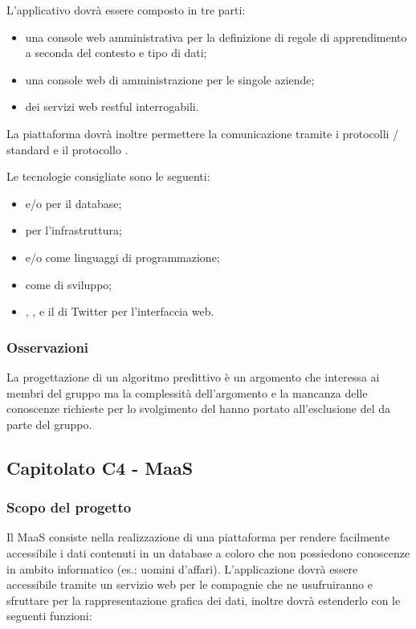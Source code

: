 L'applicativo  dovrà essere composto in tre parti:
\begin{itemize}
	\item una console web amministrativa per la definizione di regole di apprendimento a seconda del contesto e tipo di dati;
	\item una console web di amministrazione per le singole aziende;
	\item dei servizi web restful  interrogabili.
\end{itemize}
La piattaforma dovrà inoltre permettere la comunicazione tramite i protocolli / standard e il protocollo .


Le tecnologie consigliate sono le seguenti:
\begin{itemize}
	\item {} e/o  per il database;
	\item {} per l'infrastruttura;
	\item {} e/o  come linguaggi di programmazione;
	\item {} come  di sviluppo;
	\item {}, ,  e il   di Twitter per l'interfaccia web.
\end{itemize}

\subsubsection{Osservazioni}
La progettazione di un algoritmo predittivo è un argomento che interessa ai membri del gruppo ma la complessità dell'argomento e la mancanza delle conoscenze
richieste per lo svolgimento del  hanno portato all'esclusione del  da parte del gruppo.



\subsection{Capitolato C4 - MaaS}
\subsubsection{Scopo del progetto}
Il  MaaS consiste nella realizzazione di una piattaforma per rendere facilmente accessibile i dati contenuti in un database a coloro che non possiedono conoscenze in ambito informatico (es.: uomini d'affari).
L'applicazione dovrà essere accessibile tramite un servizio web per le compagnie che ne usufruiranno e sfruttare  per la rappresentazione grafica dei dati, inoltre dovrà estenderlo con le seguenti funzioni:

